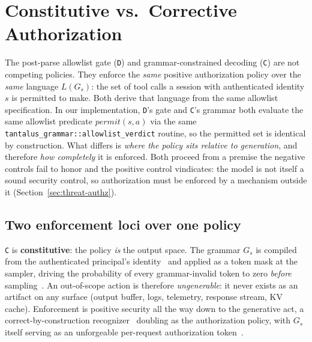 \section{Constitutive vs.\ Corrective Authorization}
\label{sec:core}

The post-parse allowlist gate (\texttt{D}) and grammar-constrained decoding (\texttt{C}) are not competing policies. They enforce the \emph{same} positive authorization policy over the \emph{same} language \(L(G_s)\): the set of tool calls a session with authenticated identity \(s\) is permitted to make. Both derive that language from the same allowlist specification. In our implementation, \texttt{D}'s gate and \texttt{C}'s grammar both evaluate the same allowlist predicate \(\mathit{permit}(s,a)\) via the same \texttt{tantalus\_grammar::allowlist\_verdict} routine, so the permitted set is identical by construction. What differs is \emph{where the policy sits relative to generation}, and therefore \emph{how completely} it is enforced. Both proceed from a premise the negative controls fail to honor and the positive control vindicates: the model is not itself a sound security control, so authorization must be enforced by a mechanism outside it (Section~\ref{sec:threat-authz}).

\subsection{Two enforcement loci over one policy}
\label{sec:core:loci}

\texttt{C} is \textbf{constitutive}: the policy \emph{is} the output space. The grammar \(G_s\) is compiled from the authenticated principal's identity~\cite{sassaman2013langsec} and applied as a token mask at the sampler, driving the probability of every grammar-invalid token to zero \emph{before} sampling~\cite{willard2023,dong2024xgrammar}. An out-of-scope action is therefore \emph{ungenerable}: it never exists as an artifact on any surface (output buffer, logs, telemetry, response stream, KV cache). Enforcement is positive security all the way down to the generative act, a correct-by-construction recognizer~\cite{sassaman2013langsec} doubling as the authorization policy, with \(G_s\) itself serving as an unforgeable per-request authorization token~\cite{dennisvanhorn1966,miller2006}.


